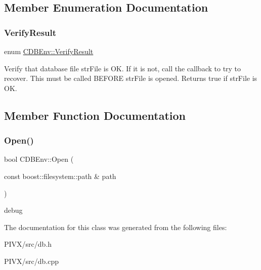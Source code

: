 \subsection{Member Enumeration Documentation}
\mbox{\label{class_c_d_b_env_a6fbf26da5d7f8f64a77a3ba15e4df244}} 
\subsubsection{\texorpdfstring{Verify\+Result}{VerifyResult}}
{\footnotesize\ttfamily enum \mbox{\hyperlink{class_c_d_b_env_a6fbf26da5d7f8f64a77a3ba15e4df244}{C\+D\+B\+Env\+::\+Verify\+Result}}}

Verify that database file str\+File is OK. If it is not, call the callback to try to recover. This must be called B\+E\+F\+O\+RE str\+File is opened. Returns true if str\+File is OK. 

\subsection{Member Function Documentation}
\mbox{\label{class_c_d_b_env_aaaef61cd032e25144c06e405fb7f93cf}} 
\subsubsection{\texorpdfstring{Open()}{Open()}}
{\footnotesize\ttfamily bool C\+D\+B\+Env\+::\+Open (\begin{DoxyParamCaption}\item[{const boost\+::filesystem\+::path \&}]{path }\end{DoxyParamCaption})}

debug 

The documentation for this class was generated from the following files\+:\begin{DoxyCompactItemize}
\item 
P\+I\+V\+X/src/db.\+h\item 
P\+I\+V\+X/src/db.\+cpp\end{DoxyCompactItemize}

